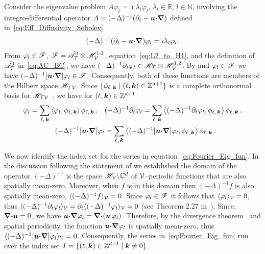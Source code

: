 \documentclass[amsa]{ipart}
\begin{document}
Consider the eigenvalue problem $A\varphi_l=\imath\lambda_l\varphi_l$,
$\lambda_l\in\mathbb{R}$, $l\in\mathbb{N}$, involving the integro-differential
operator $A=(-\Delta)^{-1}(\partial_t-\boldsymbol{u} \mbox{\boldmath${\cdot}$}\mbox{\boldmath${\nabla}$})$ defined
in~\eqref{eq:Eff_Diffusivity_Sobolev} 
%
\begin{align}\label{eq:Eig_prob_A}
  (-\Delta)^{-1}(\partial_t-\vecu \bcdot\bnabla)\varphi_l=\imath\lambda_l\varphi_l.
\end{align}
%
From $\varphi_l\in\mathscr{F}$, $\mathscr{F}=\tilde{\mathscr{A}}^0_{\mathcal{T}}\otimes\mathscr{H}^{1,2}_{\mathcal{V}}$,
equation~\eqref{eq:L2_to_H1}, and the definition of
$\tilde{\mathscr{A}}^0_{\mathcal{T}}$ in~\eqref{eq:AC_BC}, we have
$(-\Delta)^{-1}\partial_t\varphi_l\in\mathscr{H}_{\mathcal{T}}\otimes\mathscr{H}^{1,2}_{\mathcal{V}}$. By 
and $\varphi_l\in\mathscr{F}$ we have
$(-\Delta)^{-1}[\boldsymbol{u}\mbox{\boldmath${\cdot}$}\mbox{\boldmath${\nabla}$}]\varphi_l\in\mathscr{F}$. Consequently, both of these  
functions are members of the Hilbert space $\mathscr{H}_{\mathcal{T}\mathcal{V}}$. Since
$\{\phi_{\ell,\,\boldsymbol{k}} \;|\; (\ell,\boldsymbol{k})\in\mathbb{Z}^{d+1}\}$ is a complete
orthonormal basis for $\mathscr{H}_{\mathcal{T}\mathcal{V}}$~\cite{Folland:99:RealAnalysis},
we have for $(\ell,\boldsymbol{k})\in\mathbb{Z}^{d+1}$
% 
\begin{align}\label{eq:Fourier_Eig_fun}
  \varphi_l=\sum_{\ell,\,\veck}\left\langle\varphi_l,\phi_{\ell,\,\veck}\right\rangle\phi_{\ell,\,\veck}\,,
  \quad
  &(-\Delta)^{-1}\partial_t\varphi_l=\sum_{\ell,\,\veck}\left\langle(-\Delta)^{-1}\partial_t\varphi_l,\phi_{\ell,\,\veck}\right\rangle\phi_{\ell,\,\veck}\,,
  \\
  (-\Delta)^{-1}[\vecu\bcdot\bnabla]\varphi_l
  &=\sum_{\ell,\,\veck}
  \left\langle(-\Delta)^{-1}[\vecu\bcdot\bnabla]\varphi_l,\phi_{\ell,\,\veck}\right\rangle\phi_{\ell,\,\veck}\,.
  \notag
\end{align}
%



We now identify the index set for the series
in equation~\eqref{eq:Fourier_Eig_fun}. In the discussion following the
statement of  we established the domain of 
the operator $(-\Delta)^{-1}$ is the space $\mathscr{H}_{\mathcal{V}}\backslash\mathbb{C}^d$ of
$\mathcal{V}$--periodic functions that are also spatially mean-zero. Moreover,
when $f$ is in this domain then $(-\Delta)^{-1}f$ is also
spatially mean-zero, $\langle(-\Delta)^{-1}f\rangle_{\mathcal{V}}=0$. Since $\varphi_l\in\mathscr{F}$ it
follows that $\langle\varphi_l\rangle_{\mathcal{V}}=0$, thus
$\langle(-\Delta)^{-1}\partial_t\varphi_l\rangle_{\mathcal{V}}=\partial_t\langle(-\Delta)^{-1}\varphi_l\rangle_{\mathcal{V}}=0$ (see Theorem 2.27
in~\cite{Folland:99:RealAnalysis}). Since, 
$\mbox{\boldmath${\nabla}$}\mbox{\boldmath${\cdot}$}\boldsymbol{u}=0$, we have
$\boldsymbol{u}\mbox{\boldmath${\cdot}$}\mbox{\boldmath${\nabla}$}\varphi_l=\mbox{\boldmath${\nabla}$}\mbox{\boldmath${\cdot}$}(\boldsymbol{u}\,\varphi_l)$. Therefore, by the
divergence theorem~\cite{McOwen:2003:PDE} and spatial periodicity, the
function $\boldsymbol{u}\mbox{\boldmath${\cdot}$}\mbox{\boldmath${\nabla}$}\varphi_l$ is spatially mean-zero, thus
$\langle(-\Delta)^{-1}[\boldsymbol{u}\mbox{\boldmath${\cdot}$}\mbox{\boldmath${\nabla}$}]\varphi_l\rangle_{\mathcal{V}}=0$. Consequently, the series
in~\eqref{eq:Fourier_Eig_fun} run over the index set   
$I=\{(\ell,\boldsymbol{k})\in\mathbb{Z}^{d+1} \;|\; \boldsymbol{k}\neq0\}$.
\end{document}
